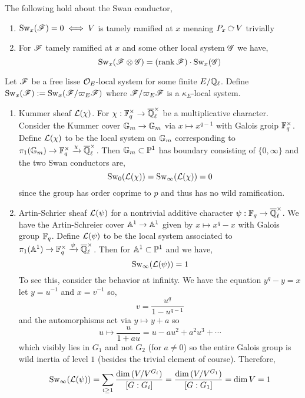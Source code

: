 \documentclass[12pt]{article}
\begin{document}
\begin{prop}
The following hold about the Swan conductor,
\begin{enumerate}
\item $\mathrm{Sw}_x(\mathscr{F}) = 0 \iff V$ is tamely ramified at $x$ menaing $P_x \acts V$ trivially
\item For $\mathscr{F}$ tamely ramified at $x$ and some other local system $\mathscr{G}$ we have,
\[ \mathrm{Sw}_x(\mathscr{F} \otimes \mathscr{G}) = (\operatorname{\mathrm{rank}} \mathscr{F}) \cdot \mathrm{Sw}_x(\mathscr{G}) \]
\end{enumerate}
\end{prop}

\begin{prop}
Let $\mathscr{F}$ be a free lisse $\mathcal{O}_{E}$-local system for some finite $E / \mathbb{Q}_\ell$. Define $\mathrm{Sw}_x(\mathscr{F}) := \mathrm{Sw}_x(\mathscr{F} / \varpi_E \mathscr{F})$ where $\mathscr{F} / \varpi_E \mathscr{F}$ is a $\kappa_E$-local system.  
\end{prop}

\newcommand{\Qbar}{\overline{\Q}}

\begin{example}
\begin{enumerate}
\item Kummer sheaf $\mathcal{L}(\chi)$. For $\chi : \FF_q^\times \to \Qbar_\ell^\times$ be a  multiplicative character. Consider the Kummer cover $\mathbb{G}_m \to \mathbb{G}_m$ via $x \mapsto x^{q-1}$ with Galois groip $\mathbb{F}_q^\times$. Define $\mathcal{L}(\chi)$ to be the local system on $\mathbb{G}_m$ corresponding to $\pi_1(\mathbb{G}_m) \to \mathbb{F}_q^\times \xrightarrow{\chi} \overline{\mathbb{Q}}_\ell^\times$. Then $\mathbb{G}_m \subset \mathbb{P}^1$ has boundary consisting of $\{ 0, \infty \}$ and the two Swan conductors are,
\[ \mathrm{Sw}_0(\mathcal{L}(\chi)) = \mathrm{Sw}_\infty(\mathcal{L}(\chi)) = 0 \]
since the group has order coprime to $p$ and thus has no wild ramification.

\item Artin-Schrier sheaf $\mathcal{L}(\psi)$ for a nontrivial additive character $\psi : \FF_q \to \Qbar_\ell^\times$. We have the Artin-Schreier cover $\mathbb{A}^1 \to \mathbb{A}^1$ given by $x \mapsto x^q - x$ with Galois group $\mathbb{F}_q$. Define $\mathcal{L}(\psi)$ to be the local system associated to $\pi_1(\A^1) \to \FF_q^\times \xrightarrow{\psi} \Qbar_\ell^\times$. Then for $\mathbb{A}^1 \subset \mathbb{P}^1$ and we have,
\[ \mathrm{Sw}_\infty(\mathcal{L}(\psi)) = 1 \]
To see this, consider the behavior at infinity. We have the equation $y^q - y = x$ let $y = u^{-1}$ and $x = v^{-1}$ so,
\[ v = \frac{u^q}{1 - u^{q-1}} \]
and the automorphisms act via $y \mapsto y + a$ so 
\[ u \mapsto \frac{u}{1 + a u} = u - a u^2 + a^2 u^3 + \cdots \]
which visibly lies in $G_1$ and not $G_2$ (for $a \neq 0$) so the entire Galois group is wild inertia of level $1$ (besides the trivial element of course). Therefore,
\[ \mathrm{Sw}_\infty(\mathcal{L}(\psi)) = \sum_{i \ge 1} \frac{\dim{(V/V^{G_i})}}{[G : G_i]} = \frac{\dim{(V/V^{G_1})}}{[G : G_1]} = \dim{V} = 1 \]
\end{enumerate}
\end{example}
\end{document}
